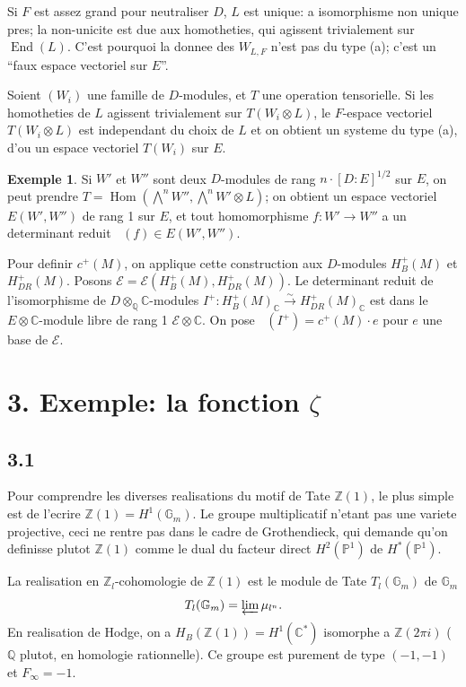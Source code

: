 \documentclass[12pt,a4paper]{article}
\theoremstyle{plain}
\theoremstyle{definition}
\newtheorem{example}[definition]{Exemple}
\theoremstyle{remark}
\DeclareMathOperator{\Hom}{Hom}
\DeclareMathOperator{\End}{End}
\DeclareMathOperator{\detred}{det^{red}}
\newcommand{\Q}{\mathbb{Q}}
\newcommand{\C}{\mathbb{C}}
\newcommand{\Z}{\mathbb{Z}}
\newcommand{\PP}{\mathbb{P}}
\begin{document}
Si $F$ est assez grand pour neutraliser $D$, $L$ est unique: a isomorphisme non unique
pres; la non-unicite est due aux homotheties, qui agissent trivialement sur $\End(L)$.
C'est pourquoi la donnee des $W_{L,F}$ n'est pas du type (a); c'est un ``faux espace
vectoriel sur $E$''.

Soient $(W_i)$ une famille de $D$-modules, et $T$ une operation tensorielle. Si les
homotheties de $L$ agissent trivialement sur $T(W_i \otimes L)$, le $F$-espace vectoriel
$T(W_i \otimes L)$ est independant du choix de $L$ et on obtient un systeme du type (a), d'ou un espace
vectoriel $T(W_i)$ sur $E$.

\begin{example}
Si $W'$ et $W''$ sont deux $D$-modules de rang $n \cdot [D:\!E]^{1/2}$ sur $E$, on peut
prendre $T = \Hom(\bigwedge^n W'', \bigwedge^n W' \otimes L)$; on obtient un espace vectoriel
$E(W', W'')$ de rang 1 sur $E$, et tout homomorphisme $f: W' \to W''$ a un determinant
reduit $\detred(f) \in E(W', W'')$.
\end{example}

Pour definir $c^+(M)$, on applique cette construction aux $D$-modules $H^+_B(M)$ et
$H^+_{DR}(M)$. Posons $\mathcal{E} = \mathcal{E}(H^+_B(M), H^+_{DR}(M))$. Le determinant reduit de
l'isomorphisme de $D \otimes_\Q \C$-modules $I^+: H^+_B(M)_\C \xrightarrow{\sim} H^+_{DR}(M)_\C$
est dans le $E \otimes \C$-module libre de rang 1 $\mathcal{E} \otimes \C$. On pose
$\detred(I^+) = c^+(M) \cdot e$ pour $e$ une base de $\mathcal{E}$.

\section*{3. Exemple: la fonction $\zeta$}

\subsection*{3.1}

Pour comprendre les diverses realisations du motif de Tate $\Z(1)$, le plus simple est
de l'ecrire $\Z(1) = H^1(\mathbb{G}_m)$. Le groupe multiplicatif n'etant pas une variete
projective, ceci ne rentre pas dans le cadre de Grothendieck, qui demande qu'on
definisse plutot $\Z(1)$ comme le dual du facteur direct $H^2(\PP^1)$ de $H^*(\PP^1)$.

La realisation en $\Z_l$-cohomologie de $\Z(1)$ est le module de Tate $T_l(\mathbb{G}_m)$ de
$\mathbb{G}_m$
\[
T_l(\mathbb{G}_m) = \varprojlim \mu_{l^n}.
\]
En realisation de Hodge, on a $H_B(\Z(1)) = H^1(\C^*)$ isomorphe a $\Z(2\pi i)$ ($\Q$
plutot, en homologie rationnelle). Ce groupe est purement de type $(-1,-1)$ et
$F_\infty = -1$.
\end{document}
